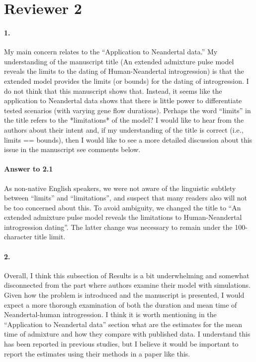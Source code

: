 \documentclass[11pt]{article}
\let\oldparagraph\paragraph
\renewcommand{\paragraph}[1]{\oldparagraph{#1}\mbox{}}
\begin{document}
\section{Reviewer 2}\label{Reviewer 2}

\paragraph{1.}
My main concern relates to the “Application to Neandertal data.” My understanding of the manuscript title (An extended admixture pulse model reveals the limits to the dating of Human-Neandertal introgression) is that the extended model provides the limits (or bounds) for the dating of introgression. I do not think that this manuscript shows that. Instead, it seems like the application to Neandertal data shows that there is little power to differentiate tested scenarios (with varying gene flow durations). Perhaps the word “limits” in the title refers to the *limitations* of the model? I would like to hear from the authors about their intent and, if my understanding of the title is correct (i.e., limits == bounds), then I would like to see a more detailed discussion about this issue in the manuscript see comments below.

\paragraph{Answer to 2.1}
As non-native English speakers, we were not aware of the linguistic subtlety between ``limits'' and  ``limitations'', and suspect that many readers also will not be too concerned about this. To avoid ambiguity, we changed the title to ``An extended admixture pulse model reveals the limitations to Human-Neandertal introgression dating''. The latter change was necessary to remain under the 100-character title limit.

\paragraph{2.}
Overall, I think this subsection of Results is a bit underwhelming and somewhat disconnected from the part where authors examine their model with simulations. Given how the problem is introduced and the manuscript is presented, I would expect a more thorough examination of both the duration and mean time of Neandertal-human introgression. I think it is worth mentioning in the “Application to Neandertal data” section what are the estimates for the mean time of admixture and how they compare with published data. I understand this has been reported in previous studies, but I believe it would be important to report the estimates using their methods in a paper like this.
\end{document}
